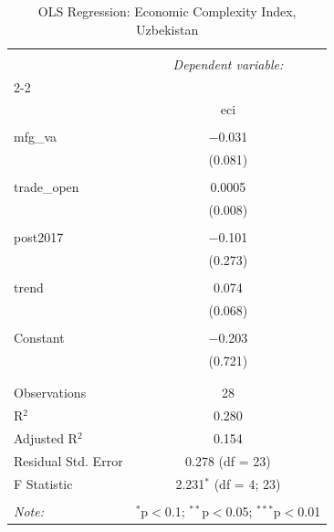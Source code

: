 
\begin{table}[!htbp] \centering 
  \caption{OLS Regression: Economic Complexity Index, Uzbekistan} 
  \label{tab:ols_eci} 
\begin{tabular}{@{\extracolsep{5pt}}lc} 
\\[-1.8ex]\hline 
\hline \\[-1.8ex] 
 & \multicolumn{1}{c}{\textit{Dependent variable:}} \\ 
\cline{2-2} 
\\[-1.8ex] & eci \\ 
\hline \\[-1.8ex] 
 mfg\_va & $-$0.031 \\ 
  & (0.081) \\ 
  & \\ 
 trade\_open & 0.0005 \\ 
  & (0.008) \\ 
  & \\ 
 post2017 & $-$0.101 \\ 
  & (0.273) \\ 
  & \\ 
 trend & 0.074 \\ 
  & (0.068) \\ 
  & \\ 
 Constant & $-$0.203 \\ 
  & (0.721) \\ 
  & \\ 
\hline \\[-1.8ex] 
Observations & 28 \\ 
R$^{2}$ & 0.280 \\ 
Adjusted R$^{2}$ & 0.154 \\ 
Residual Std. Error & 0.278 (df = 23) \\ 
F Statistic & 2.231$^{*}$ (df = 4; 23) \\ 
\hline 
\hline \\[-1.8ex] 
\textit{Note:}  & \multicolumn{1}{r}{$^{*}$p$<$0.1; $^{**}$p$<$0.05; $^{***}$p$<$0.01} \\ 
\end{tabular} 
\end{table} 
